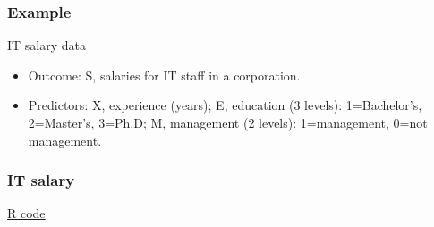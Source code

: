 \documentclass[handout]{beamer}
\begin{document}
   \begin{frame} \frametitle{Example}

   \begin{block}
   {IT salary data}
   \begin{itemize}

   \item Outcome: S, salaries for IT staff in a corporation.

   \item Predictors: X, experience (years);  E, education (3 levels): 1=Bachelor's, 2=Master's, 3=Ph.D; M, management (2 levels): 1=management, 0=not management.

   \end{itemize}
   \end{block}
   \end{frame}



   \begin{frame}
   \frametitle{IT salary}
   \begin{center}
   \end{center}
   \href{http://stats191.stanford.edu/interactions.html#salary-example}{R code}
   \end{frame}

\end{document}
